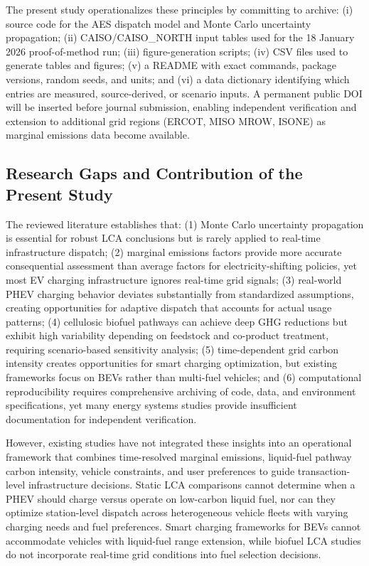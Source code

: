 \documentclass[cleantechnol,article,submit,pdftex,moreauthors]{Definitions/mdpi}
\begin{document}
The present study operationalizes these principles by committing to archive: (i) source code for the AES dispatch model and Monte Carlo uncertainty propagation; (ii) CAISO/CAISO\_NORTH input tables used for the 18 January 2026 proof-of-method run; (iii) figure-generation scripts; (iv) CSV files used to generate tables and figures; (v) a README with exact commands, package versions, random seeds, and units; and (vi) a data dictionary identifying which entries are measured, source-derived, or scenario inputs. A permanent public DOI will be inserted before journal submission, enabling independent verification and extension to additional grid regions (ERCOT, MISO MROW, ISONE) as marginal emissions data become available.

\subsection{Research Gaps and Contribution of the Present Study}

The reviewed literature establishes that: (1) Monte Carlo uncertainty propagation is essential for robust LCA conclusions but is rarely applied to real-time infrastructure dispatch; (2) marginal emissions factors provide more accurate consequential assessment than average factors for electricity-shifting policies, yet most EV charging infrastructure ignores real-time grid signals; (3) real-world PHEV charging behavior deviates substantially from standardized assumptions, creating opportunities for adaptive dispatch that accounts for actual usage patterns; (4) cellulosic biofuel pathways can achieve deep GHG reductions but exhibit high variability depending on feedstock and co-product treatment, requiring scenario-based sensitivity analysis; (5) time-dependent grid carbon intensity creates opportunities for smart charging optimization, but existing frameworks focus on BEVs rather than multi-fuel vehicles; and (6) computational reproducibility requires comprehensive archiving of code, data, and environment specifications, yet many energy systems studies provide insufficient documentation for independent verification.

However, existing studies have not integrated these insights into an operational framework that combines time-resolved marginal emissions, liquid-fuel pathway carbon intensity, vehicle constraints, and user preferences to guide transaction-level infrastructure decisions. Static LCA comparisons cannot determine when a PHEV should charge versus operate on low-carbon liquid fuel, nor can they optimize station-level dispatch across heterogeneous vehicle fleets with varying charging needs and fuel preferences. Smart charging frameworks for BEVs cannot accommodate vehicles with liquid-fuel range extension, while biofuel LCA studies do not incorporate real-time grid conditions into fuel selection decisions.
\end{document}
